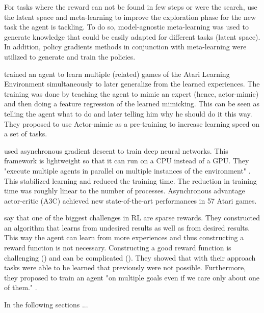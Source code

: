 For tasks where the reward can not be found in few steps or were the search, \citet{MAESN} use the latent space and meta-learning to improve the exploration phase for the new task the agent is tackling. To do so, model-agnostic meta-learning was used to generate knowledge that could be easily adapted for different tasks (latent space). In addition, policy gradients methods in conjunction with meta-learning were utilized to generate and train the policies. 

\citet{parisotto2015actor} trained an agent to learn multiple (related) games of the Atari Learning Environment simultaneously to later generalize from the learned experiences. The training was done by teaching the agent to mimic an expert (hence, actor-mimic) and then doing a feature regression of the learned mimicking. This can be seen as telling the agent what to do and later telling him why he should do it this way. They proposed to use Actor-mimic as a pre-training to increase learning speed on a set of tasks.

\citet{mnih2016asynchronous} used asynchronous gradient descent to train deep neural networks. This framework is lightweight so that it can run on a CPU instead of a GPU. They "execute multiple agents in parallel on multiple instances of the environment" \citet{mnih2016asynchronous}. This stabilized learning and reduced the training time. The reduction in training time was roughly linear to the number of processes. Asynchronous advantage actor-critic (A3C) achieved new state-of-the-art performances in 57 Atari games.

\citet{andrychowicz2017hindsight} say that one of the biggest challenges in RL are sparse rewards. They constructed an algorithm that learns from undesired results as well as from desired results. This way the agent can learn from more experiences and thus constructing a reward function is not necessary. Constructing a good reward function is challenging (\cite{ng1999policy}) and can be complicated (\cite{popov2017data}). They showed that with their approach tasks were able to be learned that previously were not possible. Furthermore, they proposed to train an agent "on multiple goals even if we care only about one of them." \citet{andrychowicz2017hindsight}.

In the following sections ...
\fi